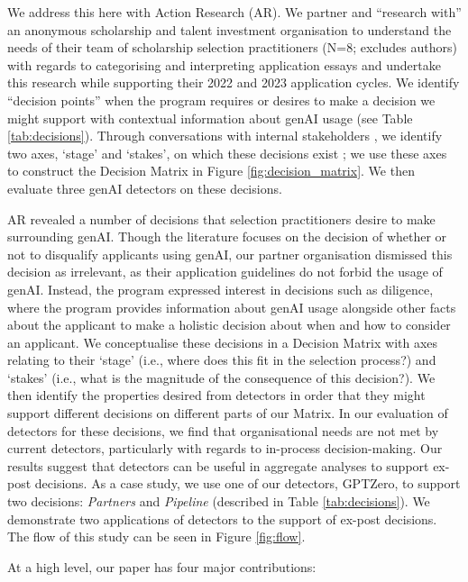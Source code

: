 We address this here with Action Research (AR). We partner and ``research with'' \cite{bradbury_action_2003} an anonymous scholarship and talent investment organisation to understand the needs of their team of scholarship selection practitioners (N=8; excludes authors) with regards to categorising and interpreting application essays and undertake this research while supporting their 2022 and 2023 application cycles. We identify ``decision points'' when the program requires or desires to make a decision we might support with contextual information about genAI usage (see Table \ref{tab:decisions}). Through conversations with internal stakeholders \cite{Hayes_2011}, we identify two axes, `stage' and `stakes', on which these decisions exist \cite{braun_using_2006}; we use these axes to construct the Decision Matrix in Figure \ref{fig:decision_matrix}. We then evaluate three genAI detectors on these decisions.

AR revealed a number of decisions that selection practitioners desire to make surrounding genAI. Though the literature focuses on the decision of whether or not to disqualify applicants using genAI, our partner organisation dismissed this decision as irrelevant, as their application guidelines do not forbid the usage of genAI. Instead, the program expressed interest in decisions such as diligence, where the program provides information about genAI usage alongside other facts about the applicant to make a holistic decision about when and how to consider an applicant. We conceptualise these decisions in a Decision Matrix with axes relating to their `stage' (i.e., where does this fit in the selection process?) and `stakes' (i.e., what is the magnitude of the consequence of this decision?). We then identify the properties desired from detectors in order that they might support different decisions on different parts of our Matrix. In our evaluation of detectors for these decisions, we find that organisational needs are not met by current detectors, particularly with regards to in-process decision-making. Our results suggest that detectors can be useful in aggregate analyses to support ex-post decisions. As a case study, we use one of our detectors, GPTZero, to support two decisions: \emph{Partners} and \emph{Pipeline} (described in Table \ref{tab:decisions}). We demonstrate two applications of detectors to the support of ex-post decisions. The flow of this study can be seen in Figure \ref{fig:flow}.

At a high level, our paper has four major contributions:

